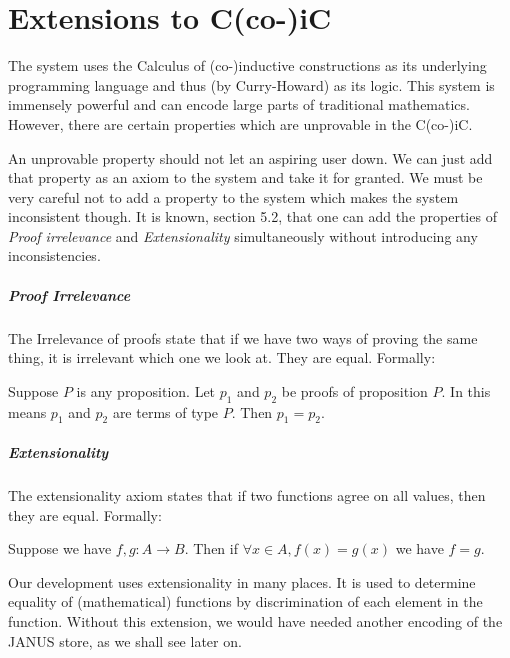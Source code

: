 \chapter{Extensions to C(co-)iC}

The \coq{} system uses the Calculus of (co-)inductive
constructions as its underlying programming language and thus (by
Curry-Howard) as its logic. This system is immensely powerful and
can encode large parts of traditional mathematics. However, there are
certain properties which are unprovable in the C(co-)iC.

An unprovable property should not let an aspiring \coq{} user down. We
can just add that property as an axiom to the system and take it for
granted. We must be very careful not to add a property to the system
which makes the system inconsistent though. It is known,
\cite{coq-add} section 5.2, that one can add the properties of \emph{Proof
  irrelevance} and \emph{Extensionality} simultaneously without
introducing any inconsistencies.

\paragraph{Proof Irrelevance}
\label{sec:proof-irrelevance}

The Irrelevance of proofs state that if we have two ways of proving
the same thing, it is irrelevant which one we look at. They are
equal. Formally:
\begin{axm}
  Suppose $P$ is any proposition. Let $p_1$ and $p_2$ be proofs of
  proposition $P$. In \coq{} this means $p_1$ and $p_2$ are terms of
  type $P$. Then $p_1 = p_2$.
\end{axm}

\paragraph{Extensionality}
\label{coqext:extensionality}

The extensionality axiom states that if two functions agree on all
values, then they are equal. Formally:
\begin{axm}
  Suppose we have $f, g \colon A \to B$. Then if $\forall x \in A,
  f(x) = g(x)$ we have $f = g$.
\end{axm}
Our development uses extensionality in many places. It is used to
determine equality of (mathematical) functions by discrimination of
each element in the function. Without this extension, we would have
needed another encoding of the JANUS store, as we shall see later
on.

